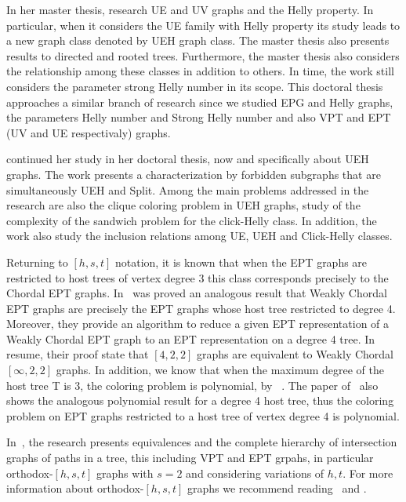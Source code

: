 In her master thesis, \citet{petito2002grafos} research UE and UV graphs and the Helly property. In particular, when it considers the UE family with Helly property its study leads to a new graph class denoted by UEH graph class. The master thesis also presents results to directed and rooted trees. Furthermore, the master thesis also considers the relationship among these classes in addition to others. In time, the work still considers the parameter strong Helly number in its scope. This doctoral thesis approaches a similar branch of research since we studied EPG and Helly graphs, the parameters Helly number and Strong Helly number and also VPT and EPT (UV and UE respectivaly) graphs.

 \citet{petito2002grafos} continued her study in her doctoral thesis, now \citet{petito2009grafos} and specifically about UEH graphs. The work presents a characterization by forbidden subgraphs that are simultaneously UEH and Split.  Among the main problems addressed in the research are also the clique coloring problem in UEH graphs, study of the complexity of the sandwich problem for the click-Helly class. In addition, the work also study the inclusion relations among UE, UEH and Click-Helly classes.

Returning to $[h,s,t]$ notation, it is known that when the EPT graphs are restricted to host trees of vertex degree 3 this class corresponds precisely to the Chordal EPT graphs. In~\citet{golumbic2008representing} was  proved an analogous result that Weakly Chordal EPT graphs are precisely the EPT graphs whose host tree restricted to degree 4. Moreover, they provide an algorithm to reduce a given EPT representation of a Weakly Chordal EPT graph to an EPT representation on a degree 4 tree. In resume, their proof state that  $[4, 2, 2]$ graphs are equivalent to Weakly Chordal $[\infty, 2, 2]$ graphs. In addition, we know that when the maximum degree of the host tree T is 3, the coloring problem is polynomial, by
~\cite{golumbic1985}. The paper of~\cite{golumbic2008representing} also shows the analogous polynomial result for a degree 4 host tree, thus the coloring problem on EPT graphs restricted to a host tree of vertex degree 4 is polynomial.

In~\citet{golumbic2008equivalences}, the research presents equivalences and the complete hierarchy of intersection graphs of paths in a tree, this including VPT and EPT grpahs, in particular orthodox-$[h,s,t]$ graphs with $s=2$ and considering variations of $h,t$. For more information about orthodox-$[h,s,t]$ graphs we recommend reading~\citet{jamison2005constant} and \citet{jose2018}.

